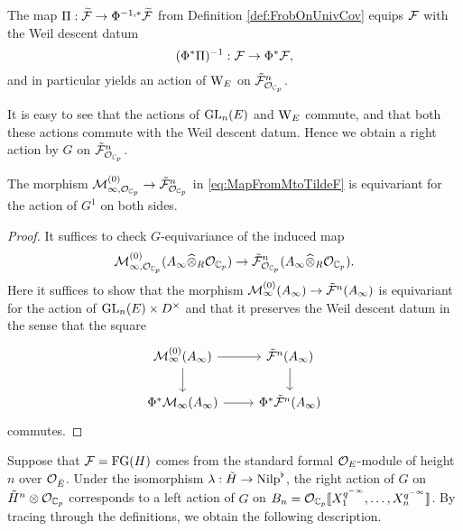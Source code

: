 \documentclass[../main.tex]{subfiles}
\begin{document}
The map $\Pi: \widetilde{\mathcal{F}} \to \Phi^{-1,*}\widetilde{\mathcal{F}}$ from Definition 
\ref{def:FrobOnUnivCov} equips $\mathcal{F}$ with the Weil descent datum
\begin{equation*}
  (\Phi^*{\Pi})^{-1}: \mathcal{F} \to \Phi^*\mathcal{F},
\end{equation*}
and in particular yields an action of $\mathrm W_E$ on $\tilde {\mathcal{F}}_{\mathcal{O}_{\mathbb{C}_p}}^n$. 

It is easy to see that the actions of $\operatorname{GL}_n(E)$ and $\mathrm W_E$ commute,
and that both these actions commute with the Weil descent datum. Hence we
obtain a right action by $G$ on $\tilde {\mathcal{F}}^n_{\mathcal{O}_{\mathbb{C}_p}}$.

\begin{lem}\label{lem:MapToUnivCovIsEquivariant}
  The morphism $\mathcal{M}_{\infty, \mathcal{O}_{\mathbb{C}_p}}^{(0)} \to \tilde {\mathcal{F}}_{\mathcal{O}_{\mathbb{C}_p}}^n$
  in \eqref{eq:MapFromMtoTildeF} is equivariant for the action of $G^1$ on both
  sides.
\begin{proof}
  It suffices to check $G$-equivariance of the induced map
  $$\mathcal{M}_{\infty, \mathcal{O}_{\mathbb{C}_p}}^{(0)}(A_\infty \widehat \otimes_{R} \mathcal{O}_{\mathbb{C}_p}) \to \tilde
  {\mathcal{F}}^n_{\mathcal{O}_{\mathbb{C}_p}}(A_\infty \widehat \otimes_R \mathcal{O}_{\mathbb{C}_p}).$$
  Here it suffices to show that the morphism $\mathcal{M}_{\infty}^{(0)}(A_\infty) \to
  \tilde {\mathcal{F}}^n(A_\infty)$ is equivariant for the action of 
  $\operatorname{GL}_n(E) \times D^\times$ and that it preserves the Weil descent datum in 
  the sense that the square
  \begin{equation*}
    \begin{tikzcd}[ampersand replacement=\&]
    	{\cM_\infty^{(0)}(A_\infty)} \& {\tilde \cF^n(A_\infty)} \\
    	{\Phi^*\cM_\infty(A_\infty)} \& {\Phi^*\tilde \cF^n(A_\infty)}
    	\arrow[from=1-1, to=1-2]
    	\arrow[from=1-1, to=2-1]
    	\arrow[from=1-2, to=2-2]
    	\arrow[from=2-1, to=2-2]
    \end{tikzcd}
  \end{equation*}
  commutes. 
\end{proof}
\end{lem}

Suppose that $\mathcal{F} = \textnormal{FG}(H)$ comes from the standard formal $\mathcal{O}_E$-module of
height $n$ over $\mathcal{O}_{\breve {E}}$. Under the isomorphism $\lambda: \tilde H \to
{\mathrm{Nilp}}^\flat$, the right action of $G$ on $\tilde H^n \otimes \mathcal{O}_{\mathbb{C}_p}$
corresponds to a left action of $G$ on $B_n = \mathcal{O}_{\mathbb{C}_p} \llbracket X_1^{q^{- \infty}}, \dots,
X_n^{q^{- \infty}} \rrbracket$. By tracing through the definitions, we obtain the 
following description.
\end{document}
